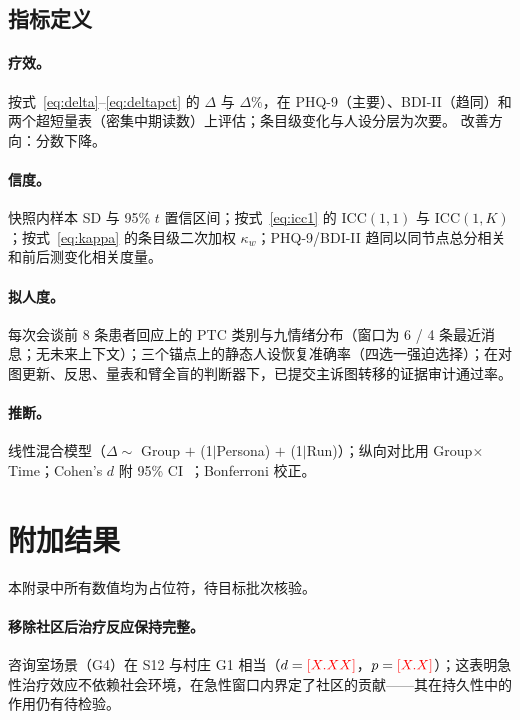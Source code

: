 \documentclass[11pt,a4paper]{article}
\newcommand{\ph}[1]{\textcolor{red}{[#1]}}
\begin{document}
\subsection{指标定义}

\paragraph{疗效。}
按式~\ref{eq:delta}--\ref{eq:deltapct} 的 $\Delta$ 与 $\Delta\%$，在 PHQ-9（主要）、BDI-II（趋同）和两个超短量表（密集中期读数）上评估；条目级变化与人设分层为次要。
改善方向：分数下降。

\paragraph{信度。}
快照内样本 SD 与 95\% $t$ 置信区间；按式~\ref{eq:icc1} 的 ICC$(1,1)$ 与 ICC$(1,K)$；按式~\ref{eq:kappa} 的条目级二次加权 $\kappa_w$；PHQ-9/BDI-II 趋同以同节点总分相关和前后测变化相关度量。

\paragraph{拟人度。}
每次会谈前 8 条患者回应上的 PTC 类别与九情绪分布（窗口为 6 / 4 条最近消息；无未来上下文）；三个锚点上的静态人设恢复准确率（四选一强迫选择）；在对图更新、反思、量表和臂全盲的判断器下，已提交主诉图转移的证据审计通过率。

\paragraph{推断。}
线性混合模型（$\Delta \sim$ Group $+$ (1$|$Persona) $+$ (1$|$Run)）；纵向对比用 Group$\times$Time；Cohen's $d$ 附 95\% CI~\citep{cohen1988}；Bonferroni 校正。

\section{附加结果}\label{app:additional}

本附录中所有数值均为占位符，待目标批次核验。

\paragraph{移除社区后治疗反应保持完整。}
咨询室场景（G4）在 S12 与村庄 G1 相当（$d = \ph{X.XX}$，$p = \ph{X.X}$）；这表明急性治疗效应不依赖社会环境，在急性窗口内界定了社区的贡献——其在持久性中的作用仍有待检验。
\end{document}
